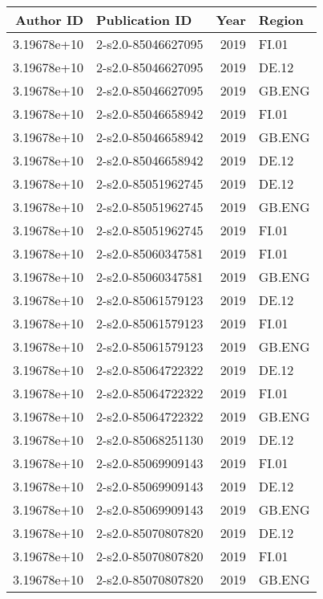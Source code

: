 \begin{tabular}{rlrl}
\hline
   Author ID & Publication ID     &   Year & Region   \\
\hline
 3.19678e+10 & 2-s2.0-85046627095 &   2019 & FI.01    \\
 3.19678e+10 & 2-s2.0-85046627095 &   2019 & DE.12    \\
 3.19678e+10 & 2-s2.0-85046627095 &   2019 & GB.ENG   \\
 3.19678e+10 & 2-s2.0-85046658942 &   2019 & FI.01    \\
 3.19678e+10 & 2-s2.0-85046658942 &   2019 & GB.ENG   \\
 3.19678e+10 & 2-s2.0-85046658942 &   2019 & DE.12    \\
 3.19678e+10 & 2-s2.0-85051962745 &   2019 & DE.12    \\
 3.19678e+10 & 2-s2.0-85051962745 &   2019 & GB.ENG   \\
 3.19678e+10 & 2-s2.0-85051962745 &   2019 & FI.01    \\
 3.19678e+10 & 2-s2.0-85060347581 &   2019 & FI.01    \\
 3.19678e+10 & 2-s2.0-85060347581 &   2019 & GB.ENG   \\
 3.19678e+10 & 2-s2.0-85061579123 &   2019 & DE.12    \\
 3.19678e+10 & 2-s2.0-85061579123 &   2019 & FI.01    \\
 3.19678e+10 & 2-s2.0-85061579123 &   2019 & GB.ENG   \\
 3.19678e+10 & 2-s2.0-85064722322 &   2019 & DE.12    \\
 3.19678e+10 & 2-s2.0-85064722322 &   2019 & FI.01    \\
 3.19678e+10 & 2-s2.0-85064722322 &   2019 & GB.ENG   \\
 3.19678e+10 & 2-s2.0-85068251130 &   2019 & DE.12    \\
 3.19678e+10 & 2-s2.0-85069909143 &   2019 & FI.01    \\
 3.19678e+10 & 2-s2.0-85069909143 &   2019 & DE.12    \\
 3.19678e+10 & 2-s2.0-85069909143 &   2019 & GB.ENG   \\
 3.19678e+10 & 2-s2.0-85070807820 &   2019 & DE.12    \\
 3.19678e+10 & 2-s2.0-85070807820 &   2019 & FI.01    \\
 3.19678e+10 & 2-s2.0-85070807820 &   2019 & GB.ENG   \\
\hline
\end{tabular}
